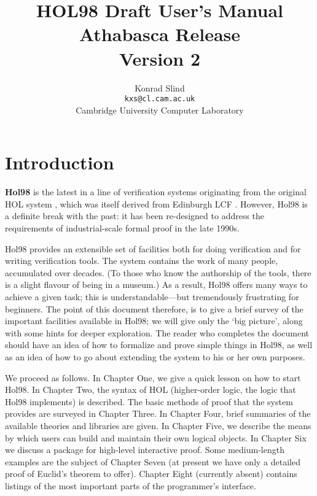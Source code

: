 \documentclass[12pt,fleqn,layout,a4paper]{report}
\begin{document}
 \title {HOL98 Draft User's Manual \\ Athabasca Release \\ Version 2}
 \author{Konrad Slind \\ {\tt kxs@cl.cam.ac.uk} \\
         Cambridge University Computer Laboratory}
 \maketitle


 \section*{Introduction}

 {\bf Hol98} is the latest in a line of verification systems originating
 from the original HOL system \cite{hol88:book}, which was itself
 derived from Edinburgh LCF \cite{lcf:book}. However, Hol98 is a
 definite break with the past: it has been re-designed to address the
 requirements of industrial-scale formal proof in the late 1990s.

 Hol98 provides an extensible set of facilities both for doing
 verification and for writing verification tools. The system contains the
 work of many people, accumulated over decades. (To those who know the
 authorship of the tools, there is a slight flavour of being in a
 museum.) As a result, Hol98 offers many ways to achieve a given task;
 this is understandable---but tremendously frustrating for beginners.
 The point of this document therefore, is to give a brief survey of the
 important facilities available in Hol98; we will give only the `big
 picture', along with some hints for deeper exploration. The reader who
 completes the document should have an idea of how to formalize and prove
 simple things in Hol98, as well as an idea of how to go about extending
 the system to his or her own purposes.

  We proceed as follows. In Chapter One, we give a quick lesson on how
 to start Hol98.  In Chapter Two, the syntax of HOL (higher-order logic,
 the logic that Hol98 implements) is described. The basic methods of
 proof that the system provides are surveyed in Chapter Three. In
 Chapter Four, brief summaries of the available theories and libraries
 are given. In Chapter Five, we describe the means by which users can
 build and maintain their own logical objects. In Chapter Six we discuss
 a package for high-level interactive proof. Some medium-length
 examples are the subject of Chapter Seven (at present we have only a
 detailed proof of Euclid's theorem to offer).  Chapter Eight (currently
 absent) contains listings of the most important parts of the
 programmer's interface.
\end{document}
